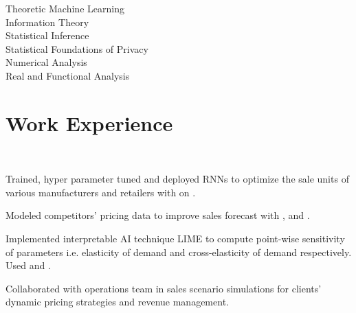 \documentclass[]{tex/deedy-resume-openfont}
\begin{document}
\begin{minipage}[t]{0.32\textwidth}
\sectionsep

Theoretic Machine Learning\\
Information Theory\\
Statistical Inference\\
Statistical Foundations of Privacy\\
Numerical Analysis \\
Real and Functional Analysis\\


%
%

\end{minipage} 
\hfill
\begin{minipage}[t]{0.66\textwidth} 


\section{Work Experience}
\\
\vspace{\topsep} %
\begin{tightemize}
    \item Trained, hyper parameter tuned and deployed RNNs to optimize the sale units of various manufacturers and retailers with  on . 
    \item Modeled competitors' pricing data to improve sales forecast with ,  and . 
    \item Implemented interpretable AI technique LIME to compute point-wise sensitivity of parameters i.e. elasticity of demand and cross-elasticity of demand respectively. Used  and .
    \item Collaborated with operations team in sales scenario simulations for clients' dynamic pricing strategies and revenue management.
\end{tightemize}
\sectionsep


\end{minipage}
\end{document}
